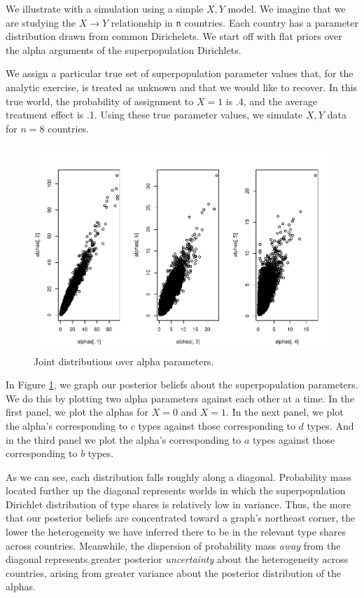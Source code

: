\documentclass[
  12pt,
]{book}
\begin{document}
We illustrate with a simulation using a simple \(X,Y\) model. We imagine that we are studying the \(X \rightarrow Y\) relationship in \texttt{n} countries. Each country has a parameter distribution drawn from common Dirichelets. We start off with flat priors over the alpha arguments of the superpopulation Dirichlets.

We assign a particular true set of superpopulation parameter values that, for the analytic exercise, is treated as unknown and that we would like to recover. In this true world, the probability of assignment to \(X=1\) is .4, and the average treatment effect is .1. Using these true parameter values, we simulate \(X, Y\) data for \(n=8\) countries.

\begin{figure}

{\centering \includegraphics{ii_files/figure-latex/plotalphas-1} 

}

\caption{Joint distributions over alpha parameters.}\label{fig:plotalphas}
\end{figure}

In Figure \ref{fig:plotalphas}, we graph our posterior beliefs about the superpopulation parameters. We do this by plotting two alpha parameters against each other at a time. In the first panel, we plot the alphas for \(X=0\) and \(X=1\). In the next panel, we plot the alpha's corresponding to \(c\) types against those corresponding to \(d\) types. And in the third panel we plot the alpha's corresponding to \(a\) types against those corresponding to \(b\) types.

As we can see, each distribution falls roughly along a diagonal. Probability mass located further up the diagonal represents worlds in which the superpopulation Dirichlet distribution of type shares is relatively low in variance. Thus, the more that our posterior beliefs are concentrated toward a graph's northeast corner, the lower the heterogeneity we have inferred there to be in the relevant type shares across countries. Meanwhile, the dispersion of probability mass \emph{away} from the diagonal represents greater posterior \emph{uncertainty} about the heterogeneity across countries, arising from greater variance about the posterior distribution of the alphas.
\end{document}
